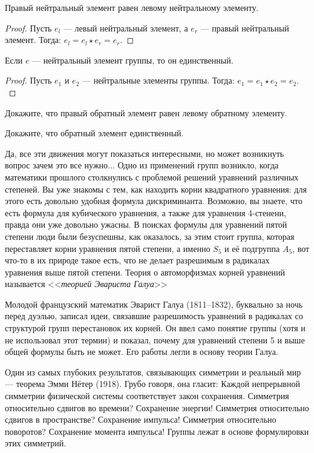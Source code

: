 \begin{proposition}
    Правый нейтральный элемент равен левому нейтральному элементу.
\end{proposition}
\begin{proof}
    Пусть $e_l$ --- левый нейтральный элемент, а $e_r$ --- правый нейтральный элемент. Тогда:
    \(
    e_l = e_l \star e_r = e_r.
    \)
\end{proof}
\begin{proposition}
    Если $e$ --- нейтральный элемент группы, то он единственный.
\end{proposition}
\begin{proof}
    Пусть $e_1$ и $e_2$ --- нейтральные элементы группы. Тогда:
    \(
        e_1 = e_1 \star e_2 = e_2.
    \)
\end{proof}
\begin{practice}
    Докажите, что правый обратный элемент равен левому обратному элементу.
\end{practice}
\begin{practice}
    Докажите, что обратный элемент единственный.
\end{practice}
    
Да, все эти движения могут показаться интересными, но может возникнуть вопрос зачем это все нужно... Одно из применений групп возникло, когда математики прошлого столкнулись с проблемой решений уравнений различных степеней. Вы уже знакомы с тем, как находить корни квадратного уравнения: для этого есть довольно удобная формула дискриминанта. Возможно, вы знаете, что есть формула для кубического уравнения, а также для уравнения 4-стенени, правда они уже довольно ужасны. В поисках формулы для уравнений пятой степени люди были безуспешны, как оказалось, за этим стоит группа, которая переставляет корни уравнения пятой степени, а именно $S_5$ и её подгруппа $A_5$, вот что-то в их природе такое есть, что не делает разрешимым в радикалах уравнения выше пятой степени. Теория о автоморфизмах корней уравнений называется <<\emph{теорией Эвариста Галуа}>>

Молодой французский математик Эварист Галуа (1811--1832), буквально за ночь перед дуэлью, записал идеи, связавшие разрешимость уравнений в радикалах со структурой групп перестановок их корней. Он ввел само понятие группы (хотя и не использовал этот термин) и показал, почему для уравнений степени 5 и выше общей формулы быть не может. Его работы легли в основу теории Галуа.

Один из самых глубоких результатов, связывающих симметрии и реальный мир --- теорема Эмми Нётер (1918). Грубо говоря, она гласит: Каждой непрерывной симметрии физической системы соответствует закон сохранения. Симметрия относительно сдвигов во времени? Сохранение энергии! Симметрия относительно сдвигов в пространстве? Сохранение импульса! Симметрия относительно поворотов? Сохранение момента импульса! Группы лежат в основе формулировки этих симметрий.

